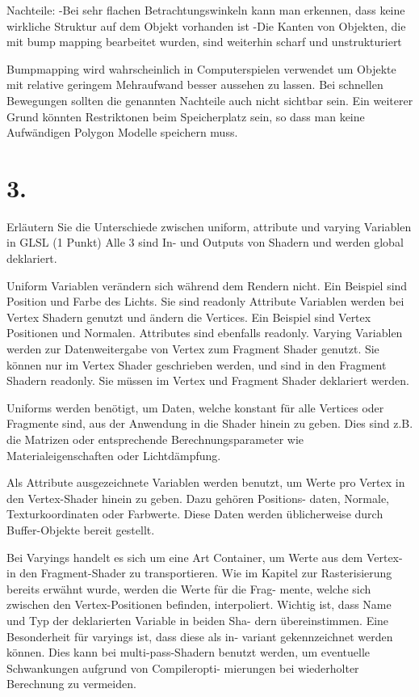 \documentclass[12pt]{scrreprt}
\begin{document}
Nachteile:
-Bei sehr flachen Betrachtungswinkeln kann man erkennen, dass keine wirkliche Struktur auf dem Objekt vorhanden ist
-Die Kanten von Objekten, die mit bump mapping bearbeitet wurden, sind weiterhin scharf und unstrukturiert

Bumpmapping wird wahrscheinlich in Computerspielen verwendet um Objekte mit relative geringem Mehraufwand besser aussehen zu lassen. Bei schnellen Bewegungen sollten die genannten Nachteile auch nicht sichtbar sein. Ein weiterer Grund könnten Restriktonen beim Speicherplatz sein, so dass man keine Aufwändigen Polygon Modelle speichern muss.

\section*{3.}
Erläutern Sie die Unterschiede zwischen uniform, attribute und varying Variablen in GLSL (1 Punkt)
Alle 3 sind In- und Outputs von Shadern und werden global deklariert.

Uniform Variablen verändern sich während dem Rendern nicht. Ein Beispiel sind Position und Farbe des Lichts. Sie sind readonly
Attribute Variablen werden bei Vertex Shadern genutzt und ändern die Vertices. Ein Beispiel sind Vertex Positionen und Normalen. Attributes sind ebenfalls readonly.
Varying Variablen werden zur Datenweitergabe von Vertex zum Fragment Shader genutzt. Sie können nur im Vertex Shader geschrieben werden, und sind in den Fragment Shadern readonly. Sie müssen im Vertex und Fragment Shader deklariert werden.


Uniforms werden benötigt, um Daten, welche konstant für alle Vertices
oder Fragmente sind, aus der Anwendung in die Shader hinein zu geben.
Dies sind z.B. die Matrizen oder entsprechende Berechnungsparameter wie
Materialeigenschaften oder Lichtdämpfung.

Als Attribute ausgezeichnete Variablen werden benutzt, um Werte pro
Vertex in den Vertex-Shader hinein zu geben. Dazu gehören Positions-
daten, Normale, Texturkoordinaten oder Farbwerte. Diese Daten werden
üblicherweise durch Buffer-Objekte bereit gestellt.

Bei Varyings handelt es sich um eine Art Container, um Werte aus
dem Vertex- in den Fragment-Shader zu transportieren. Wie im Kapitel
zur Rasterisierung bereits erwähnt wurde, werden die Werte für die Frag-
mente, welche sich zwischen den Vertex-Positionen befinden, interpoliert.
Wichtig ist, dass Name und Typ der deklarierten Variable in beiden Sha-
dern übereinstimmen. Eine Besonderheit für varyings ist, dass diese als in-
variant gekennzeichnet werden können. Dies kann bei multi-pass-Shadern
benutzt werden, um eventuelle Schwankungen aufgrund von Compileropti-
mierungen bei wiederholter Berechnung zu vermeiden.
\end{document}
